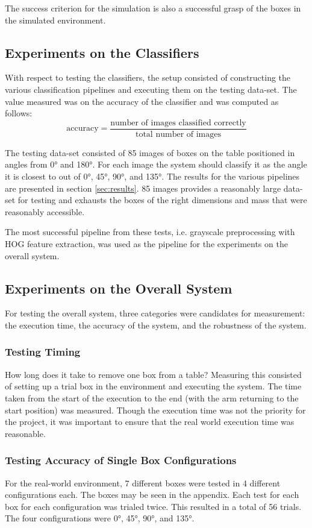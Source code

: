 \documentclass[letterpaper, 10 pt, conference]{conf/ieeeconf}  %
\begin{document}
The success criterion for the simulation is also a successful grasp of the boxes
in the simulated environment.

\subsection{Experiments on the Classifiers}
With respect to testing the classifiers, the setup consisted of constructing the
various classification pipelines and executing them on the testing data-set. The
value measured was on the accuracy of the classifier and was computed as
follows:
\begin{equation*}
  \text{accuracy} = \dfrac{\text{number of images classified correctly}}{\text{total number of images}}
\end{equation*}

The testing data-set consisted of 85 images of boxes on the table positioned in
angles from \ang{0} and \ang{180}. For each image the system should classify it
as the angle it is closest to out of \ang{0}, \ang{45}, \ang{90}, and \ang{135}.
The results for the various pipelines are presented in section
\ref{sec:results}. 85 images provides a reasonably large data-set for testing
and exhausts the boxes of the right dimensions and mass that were reasonably
accessible.

The most successful pipeline from these tests, i.e. grayscale preprocessing with
HOG feature extraction, was used as the pipeline for the experiments on the
overall system.

\subsection{Experiments on the Overall System}
For testing the overall system, three categories were candidates for
measurement: the execution time, the accuracy of the system, and the robustness
of the system.
\subsubsection{Testing Timing}
How long does it take to remove one box from a table? Measuring this consisted
of setting up a trial box in the environment and executing the system. The time
taken from the start of the execution to the end (with the arm returning to the
start position) was measured. Though the execution time was not the priority for
the project, it was important to ensure that the real world execution time was
reasonable.

\subsubsection{Testing Accuracy of Single Box Configurations}
For the real-world environment, 7 different boxes were tested in 4 different
configurations each. The boxes may be seen in the appendix. Each test for each
box for each configuration was trialed twice. This resulted in a total of 56
trials. The four configurations were \ang{0}, \ang{45}, \ang{90}, and \ang{135}.
\end{document}
